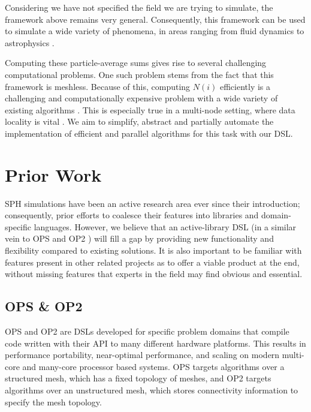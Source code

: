Considering we have not specified the field we are trying to simulate, the framework above remains very general. Consequently, this framework can be used to simulate a wide variety of phenomena, in areas ranging from fluid dynamics to astrophysics \cite{monaghan2005sph}. 



Computing these particle-average sums gives rise to several challenging computational problems. One such problem stems from the fact that this framework is meshless. Because of this, computing $N(i)$ efficiently is a challenging and computationally expensive problem with a wide variety of existing algorithms \cite{dequn2012nnsearch, prabhu2021pysph, fernandez2022octree}. This is especially true in a multi-node setting, where data locality is vital \cite{sphexa, keller2023cornerstone}. We aim to simplify, abstract and partially automate the implementation of efficient and parallel algorithms for this task with our DSL. 

\section{Prior Work}
SPH simulations have been an active research area ever since their introduction; consequently, prior efforts to coalesce their features into libraries and domain-specific languages. However, we believe that an active-library DSL (in a similar vein to OPS \cite{reguly2014ops} and OP2 \cite{mudalige2012op2}) will fill a gap by providing new functionality and flexibility compared to existing solutions. It is also important to be familiar with features present in other related projects as to offer a viable product at the end, without missing features that experts in the field may find obvious and essential.

\subsection{OPS \cite{reguly2014ops} \& OP2 \cite{mudalige2012op2}}

OPS and OP2 are DSLs developed for specific problem domains that compile code written with their API to many different hardware platforms. This results in performance portability, near-optimal performance, and scaling on modern multi-core and many-core processor based systems. OPS targets algorithms over a structured mesh, which has a fixed topology of meshes, and OP2 targets algorithms over an unstructured mesh, which stores connectivity information to specify the mesh topology.

